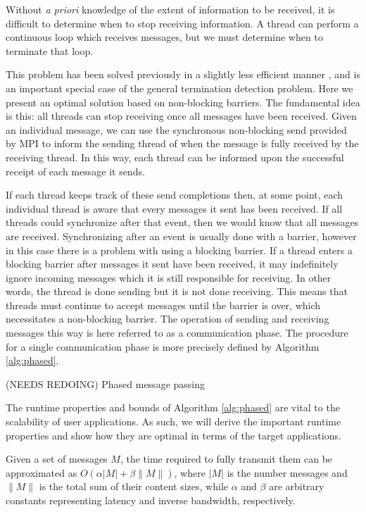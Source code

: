 Without {\it a priori} knowledge of the extent of information to be
received, it is difficult to determine when to stop receiving
information.
A thread can perform a continuous loop which receives messages,
but we must determine when to terminate that loop.

This problem has been solved previously in a slightly less efficient
manner \cite{ovcharenko2012neighborhood}, and is an important special case
of the general termination detection problem.
Here we present an optimal solution based on non-blocking barriers.
The fundamental idea is this: all threads can stop receiving
once all messages have been received.
Given an individual message, we can use the synchronous non-blocking
send provided by MPI to inform the sending thread of when the message
is fully received by the receiving thread.
In this way, each thread can be informed upon the successful receipt
of each message it sends.

If each thread keeps track of these send completions then,
at some point, each individual thread is aware that every
messages it sent has been received.
If all threads could synchronize after that event, then
we would know that all messages are received.
Synchronizing after an event is usually done with a barrier,
however in this case there is a problem with using a blocking barrier.
If a thread enters a blocking barrier after messages it sent
have been received, it may indefinitely ignore incoming messages
which it is still responsible for receiving.
In other words, the thread is done sending but it is not done receiving.
This means that threads must continue to accept messages until
the barrier is over, which necessitates a non-blocking barrier.
The operation of sending and receiving messages this way
is here referred to as a communication phase.
The procedure for a single communication phase is more precisely defined
by Algorithm \ref{alg:phased}.

\begin{algorithm}
\caption{(NEEDS REDOING) Phased message passing}
\label{alg:phased}
\end{algorithm}

The runtime properties and bounds of Algorithm \ref{alg:phased} are vital
to the scalability of user applications.
As such, we will derive the important runtime properties and show how
they are optimal in terms of the target applications.

Given a set of messages $M$, the time required to fully transmit them
can be approximated as $O(\alpha|M| + \beta\|M\|)$, where
$|M|$ is the number messages and $\|M\|$ is the total sum of their
content sizes, while $\alpha$ and $\beta$ are arbitrary constants
representing latency and inverse bandwidth, respectively.

